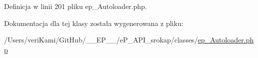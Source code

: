 Definicja w linii 201 pliku ep\-\_\-\-Autoloader.\-php.



Dokumentacja dla tej klasy została wygenerowana z pliku\-:\begin{DoxyCompactItemize}
\item 
/\-Users/veri\-Kami/\-Git\-Hub/\-\_\-\-\_\-\-E\-P\-\_\-\-\_\-/e\-P\-\_\-\-A\-P\-I\-\_\-srokap/classes/\hyperlink{ep___autoloader_8php}{ep\-\_\-\-Autoloader.\-php}\end{DoxyCompactItemize}
